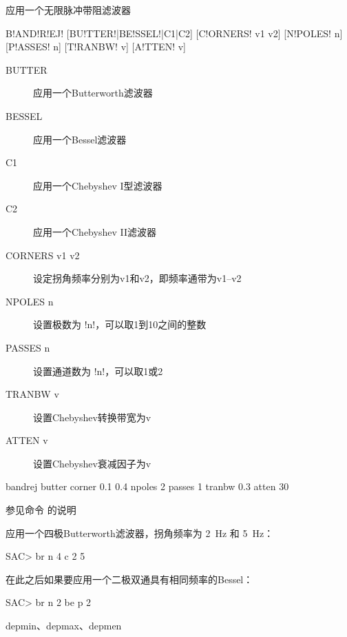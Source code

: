 \label{cmd:bandrej}

应用一个无限脉冲带阻滤波器

\begin{SACSTX}
B!AND!R!EJ! [BU!TTER!|BE!SSEL!|C1|C2] [C!ORNERS! v1 v2] [N!POLES! n] [P!ASSES! n]
    [T!RANBW! v] [A!TTEN! v]
\end{SACSTX}

\begin{description}
\item [BUTTER] 应用一个Butterworth滤波器
\item [BESSEL] 应用一个Bessel滤波器
\item [C1] 应用一个Chebyshev I型滤波器
\item [C2] 应用一个Chebyshev II滤波器
\item [CORNERS v1 v2] 设定拐角频率分别为v1和v2，即频率通带为v1--v2
\item [NPOLES n] 设置极数为 !n!，可以取1到10之间的整数
\item [PASSES n] 设置通道数为 !n!，可以取1或2
\item [TRANBW v] 设置Chebyshev转换带宽为v
\item [ATTEN v] 设置Chebyshev衰减因子为v
\end{description}

\begin{SACDFT}
bandrej butter corner 0.1 0.4 npoles 2 passes 1 tranbw 0.3 atten 30
\end{SACDFT}

参见命令  的说明

应用一个四极Butterworth滤波器，拐角频率为 \SI{2}{\Hz} 和 \SI{5}{\Hz}：
\begin{SACCode}
SAC> br n 4 c 2 5
\end{SACCode}

在此之后如果要应用一个二极双通具有相同频率的Bessel：
\begin{SACCode}
SAC> br n 2 be p 2
\end{SACCode}

depmin、depmax、depmen

